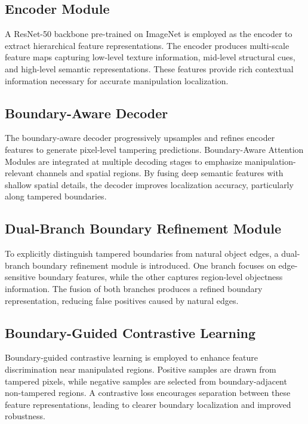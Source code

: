 \documentclass[runningheads]{llncs}
\begin{document}
\subsection{Encoder Module}

A ResNet-50 backbone pre-trained on ImageNet is employed as the encoder to extract hierarchical feature representations. The encoder produces multi-scale feature maps capturing low-level texture information, mid-level structural cues, and high-level semantic representations. These features provide rich contextual information necessary for accurate manipulation localization.

\subsection{Boundary-Aware Decoder}

The boundary-aware decoder progressively upsamples and refines encoder features to generate pixel-level tampering predictions. Boundary-Aware Attention Modules are integrated at multiple decoding stages to emphasize manipulation-relevant channels and spatial regions. By fusing deep semantic features with shallow spatial details, the decoder improves localization accuracy, particularly along tampered boundaries.

\subsection{Dual-Branch Boundary Refinement Module}

To explicitly distinguish tampered boundaries from natural object edges, a dual-branch boundary refinement module is introduced. One branch focuses on edge-sensitive boundary features, while the other captures region-level objectness information. The fusion of both branches produces a refined boundary representation, reducing false positives caused by natural edges.

\subsection{Boundary-Guided Contrastive Learning}

Boundary-guided contrastive learning is employed to enhance feature discrimination near manipulated regions. Positive samples are drawn from tampered pixels, while negative samples are selected from boundary-adjacent non-tampered regions. A contrastive loss encourages separation between these feature representations, leading to clearer boundary localization and improved robustness.
\end{document}
